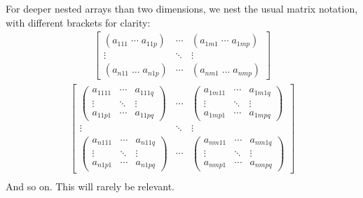 \documentclass{DIKU-report-variant}
\begin{document}
\begin{remark}
  \label{rem:deep-nesting}
  For deeper nested arrays than two dimensions, we nest the usual matrix notation,
  with different brackets for clarity:
  \begin{align*}
    \begin{bmatrix}
      (a_{111}\; \cdots\; a_{11p}) & \cdots & (a_{1m1}\; \cdots\; a_{1mp}) \\
      \vdots & \ddots & \vdots \\
      (a_{n11}\; \dots\; a_{n1p}) & \cdots & (a_{nm1}\; \dots\; a_{nmp})
    \end{bmatrix}
  \end{align*}
  \begin{align*}
    \begin{bmatrix}
      \begin{pmatrix}
        a_{1111} & \cdots & a_{111q} \\
        \vdots & \ddots & \vdots \\
        a_{11p1} & \cdots & a_{11pq} 
      \end{pmatrix} & \cdots &
      \begin{pmatrix}
        a_{1m11} & \cdots & a_{1m1q} \\
        \vdots & \ddots & \vdots \\
        a_{1mp1} & \cdots & a_{1mpq} 
      \end{pmatrix} \\
      \vdots & \ddots & \vdots \\
      \begin{pmatrix}
        a_{n111} & \cdots & a_{n11q} \\
        \vdots & \ddots & \vdots \\
        a_{n1p1} & \cdots & a_{n1pq} 
      \end{pmatrix} & \cdots &
      \begin{pmatrix}
        a_{nm11} & \cdots & a_{nm1q} \\
        \vdots & \ddots & \vdots \\
        a_{nmp1} & \cdots & a_{nmpq} 
      \end{pmatrix}
    \end{bmatrix} \\
  \end{align*}
  And so on. This will rarely be relevant.
\end{remark}
\end{document}
